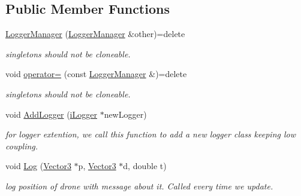 \subsection*{Public Member Functions}
\begin{DoxyCompactItemize}
\item 
\mbox{\label{classLoggerManager_a43331d83f7529a069c7832afcd0770de}} 
\hyperlink{classLoggerManager_a43331d83f7529a069c7832afcd0770de}{Logger\+Manager} (\hyperlink{classLoggerManager}{Logger\+Manager} \&other)=delete
\begin{DoxyCompactList}\small\item\em singletons should not be cloneable. \end{DoxyCompactList}\item 
\mbox{\label{classLoggerManager_a4e1527418f267a83b0e3cc99524d2ae2}} 
void \hyperlink{classLoggerManager_a4e1527418f267a83b0e3cc99524d2ae2}{operator=} (const \hyperlink{classLoggerManager}{Logger\+Manager} \&)=delete
\begin{DoxyCompactList}\small\item\em singletons should not be cloneable. \end{DoxyCompactList}\item 
\mbox{\label{classLoggerManager_a4c0d26e8fa84ef93b897bb74db482c86}} 
void \hyperlink{classLoggerManager_a4c0d26e8fa84ef93b897bb74db482c86}{Add\+Logger} (\hyperlink{classiLogger}{i\+Logger} $\ast$new\+Logger)
\begin{DoxyCompactList}\small\item\em for logger extention, we call this function to add a new logger class keeping low coupling. \end{DoxyCompactList}\item 
\mbox{\label{classLoggerManager_a82d701cebadecabc2089b36047fc00ba}} 
void \hyperlink{classLoggerManager_a82d701cebadecabc2089b36047fc00ba}{Log} (\hyperlink{classVector3}{Vector3} $\ast$p, \hyperlink{classVector3}{Vector3} $\ast$d, double t)
\begin{DoxyCompactList}\small\item\em log position of drone with message about it. Called every time we update. \end{DoxyCompactList}\end{DoxyCompactItemize}

